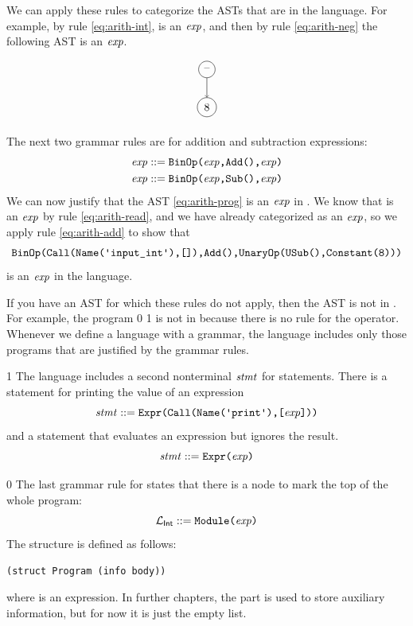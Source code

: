 \documentclass[7x10]{TimesAPriori_MIT}%
\def\racketEd{0}
\def\pythonEd{1}
\def\edition{1}
\newcommand{\racket}[1]{{\if\edition\racketEd{#1}\fi}}
\newcommand{\pythonColor}[0]{}
\newcommand{\python}[1]{{\if\edition\pythonEd\pythonColor #1\fi}}
\numberwithin{theorem}{chapter}
\numberwithin{definition}{chapter}
\numberwithin{equation}{chapter}
\begin{document}
We can apply these rules to categorize the ASTs that are in the
\LangInt{} language. For example, by rule \eqref{eq:arith-int},
 is an $\mathit{exp}$, and then by rule \eqref{eq:arith-neg} the
following AST is an $\mathit{exp}$.
\begin{center}
\begin{minipage}{0.5\textwidth}
\end{minipage}
\begin{minipage}{0.25\textwidth}
\begin{equation}
\begin{tikzpicture}
 \node[draw, circle] (minus) at (0, 0)  {$\text{--}$};
 \node[draw, circle] (8)     at (0, -1.2) {$8$};

 \draw[->] (minus) to (8);
\end{tikzpicture}
\label{eq:arith-neg8}
\end{equation}
\end{minipage}
\end{center}

The next two grammar rules are for addition and subtraction expressions:
\begin{align}
  \mathit{exp} &::= {\texttt{BinOp}\texttt{(} \mathit{exp}\texttt{,}\texttt{Add()}\texttt{,}\mathit{exp}\texttt{)}} \label{eq:arith-add}\\
  \mathit{exp} &::= {\texttt{BinOp}\texttt{(} \mathit{exp}\texttt{,}\texttt{Sub()}\texttt{,}\mathit{exp}\texttt{)}} \label{eq:arith-sub}
\end{align}
We can now justify that the AST \eqref{eq:arith-prog} is an $\mathit{exp}$ in
\LangInt{}.  We know that \READ{} is an $\mathit{exp}$ by rule
\eqref{eq:arith-read}, and we have already categorized
 as an $\mathit{exp}$, so we apply rule \eqref{eq:arith-add}
to show that
\[
\ADD{\READ{}}{\NEG{\INT{\code{8}}}}
\]
is an $\mathit{exp}$ in the \LangInt{} language.

If you have an AST for which these rules do not apply, then the
AST is not in \LangInt{}. For example, the program \racket{} \python{} is not in \LangInt{}
because there is no rule for the \key{*} operator.  Whenever we
define a language with a grammar, the language includes only those
programs that are justified by the grammar rules.

{\if\edition\pythonEd\pythonColor
The language \LangInt{} includes a second nonterminal $\mathit{stmt}$ for statements.
There is a statement for printing the value of an expression
\[
\Stmt{} ::= \PRINT{\Exp}
\]
and a statement that evaluates an expression but ignores the result.
\[
\mathit{stmt}{} ::= {\texttt{Expr}\texttt{(} \mathit{exp}\texttt{)}}
\]
\fi}

{\if\edition\racketEd
The last grammar rule for \LangInt{} states that there is a
 node to mark the top of the whole program:
\[
  \mathcal{L}_{\mathsf{Int}}{} ::= \texttt{Module}\texttt{(} \mathit{exp}\texttt{)}
\]
The  structure is defined as follows:
\begin{lstlisting}
(struct Program (info body))
\end{lstlisting}
where  is an expression. In further chapters, the 
part is used to store auxiliary information, but for now it is
just the empty list.
\fi}
\end{document}
